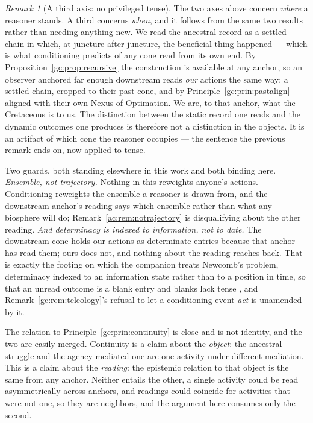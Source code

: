 \documentclass[11pt]{article}
\numberwithin{equation}{section}
\theoremstyle{plain}
\theoremstyle{definition}
\theoremstyle{remark}
\newtheorem{remark}[theorem]{Remark}
\begin{document}
\begin{remark}[A third axis: no privileged tense]\label{gc:rem:notense}
The two axes above concern \emph{where} a reasoner stands. A third
concerns \emph{when}, and it follows from the same two results rather
than needing anything new. We read the ancestral record as a settled chain in which, at juncture
after juncture, the beneficial thing happened --- which is what
conditioning predicts of any cone read from its own end. By
Proposition~\ref{gc:prop:recursive} the construction is available at any
anchor, so an observer anchored far enough downstream reads \emph{our}
actions the same way: a settled chain, cropped to their past cone, and by
Principle~\ref{gc:prin:pastalign} aligned with their own Nexus of
Optimation. We are, to that anchor, what the Cretaceous is to us. The
distinction between the static record one reads and the dynamic outcomes
one produces is therefore not a distinction in the objects. It is an
artifact of which cone the reasoner occupies --- the sentence the
previous remark ends on, now applied to tense.

Two guards, both standing elsewhere in this work and both binding here. \emph{Ensemble, not trajectory.} Nothing in this reweights anyone's
actions. Conditioning reweights the ensemble a reasoner is drawn from,
and the downstream anchor's reading says which ensemble rather than what
any biosphere will do; Remark~\ref{ac:rem:notrajectory} is disqualifying about
the other reading. \emph{And determinacy is indexed to information, not to date.} The
downstream cone holds our actions as determinate entries because that
anchor has read them; ours does not, and nothing about the reading
reaches back. That is exactly the footing on which the companion treats
Newcomb's problem, determinacy indexed to an information state rather
than to a position in time, so that an unread outcome is a blank entry
and blanks lack tense \cite{AethusDecision}, and
Remark~\ref{gc:rem:teleology}'s refusal to let a conditioning event
\emph{act} is unamended by it.

The relation to Principle~\ref{gc:prin:continuity} is close and is not
identity, and the two are easily merged.
Continuity is a claim about the \emph{object}: the ancestral struggle and
the agency-mediated one are one activity under different mediation. This
is a claim about the \emph{reading}: the epistemic relation to that
object is the same from any anchor. Neither entails the other, a
single activity could be read asymmetrically across anchors, and
readings could coincide for activities that were not one, so they are
neighbors, and the argument here consumes only the second.
\end{remark}
\end{document}
